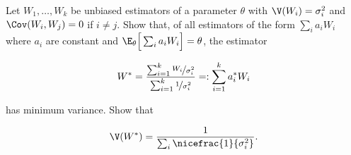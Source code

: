 
\begin{exercise}

Let $W_1,\dots,W_k$ be unbiased estimators of a parameter $\theta$ with
$\V(W_i) = \sigma_i^2$ and $\Cov(W_i,W_j) = 0$ if $i \neq j$. Show that,
of all estimators of the form $\sum_i a_iW_i$ where $a_i$ are constant and
$\E_\theta\Big[\sum_i a_iW_i\Big] = \theta$, the estimator

\begin{align*}
  W^* = \frac{\sum_{i=1}^k \nicefrac{W_i}{\sigma_i^2}}
  {\sum_{i=1}^k \nicefrac{1}{\sigma_i^2}}
  =: \sum_{i=1}^k a_i^* W_i
\end{align*}

has minimum variance. Show that

\begin{align*}
  \V(W^*) = \frac{1}{\sum_i \nicefrac{1}{\sigma_i^2}}.
\end{align*}

\end{exercise}
    
    
